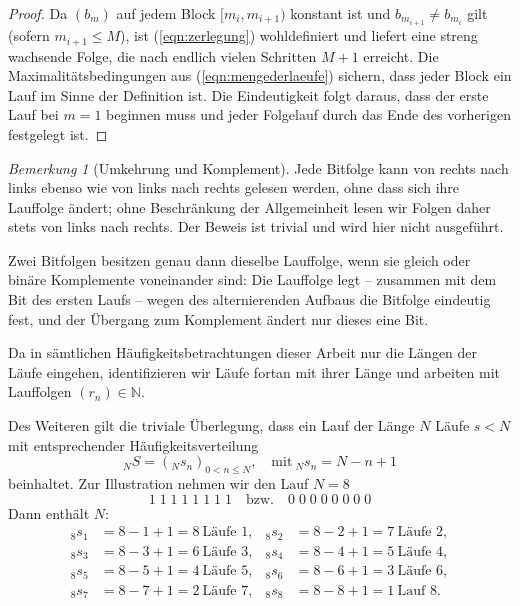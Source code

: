 \documentclass[11pt,a4paper]{scrartcl}
\theoremstyle{plain}
\theoremstyle{definition}
\theoremstyle{remark}
\newtheorem{bem}[satz]{Bemerkung}
\begin{document}
\begin{proof}
Da $(b_m)$ auf jedem Block $[m_i,m_{i+1})$ konstant ist und
$b_{m_{i+1}}\neq b_{m_i}$ gilt (sofern $m_{i+1}\leq M$), ist
(\ref{eqn:zerlegung}) wohldefiniert und liefert eine streng wachsende
Folge, die nach endlich vielen Schritten $M+1$ erreicht. Die
Maximalitätsbedingungen aus (\ref{eqn:mengederlaeufe}) sichern, dass
jeder Block ein Lauf im Sinne der Definition ist. Die Eindeutigkeit
folgt daraus, dass der erste Lauf bei $m=1$ beginnen muss und jeder
Folgelauf durch das Ende des vorherigen festgelegt ist.
\end{proof}

\begin{bem}[Umkehrung und Komplement]\label{bem:komplement}
Jede Bitfolge kann von rechts nach links ebenso wie von links nach
rechts gelesen werden, ohne dass sich ihre Lauffolge ändert; ohne
Beschränkung der Allgemeinheit lesen wir Folgen daher stets von links
nach rechts. Der Beweis ist trivial und wird hier nicht ausgeführt.

Zwei Bitfolgen besitzen genau dann dieselbe Lauffolge, wenn sie gleich
oder binäre Komplemente voneinander sind: Die Lauffolge legt -- zusammen
mit dem Bit des ersten Laufs -- wegen des alternierenden Aufbaus die
Bitfolge eindeutig fest, und der Übergang zum Komplement ändert nur
dieses eine Bit.
\end{bem}

\noindent Da in sämtlichen Häufigkeitsbetrachtungen dieser Arbeit nur die
Längen der Läufe eingehen, identifizieren wir Läufe fortan mit ihrer
Länge und arbeiten mit Lauffolgen $(r_n)\in\mathbb N$.

Des Weiteren gilt die triviale Überlegung, dass ein Lauf der Länge
$N$ Läufe $s<N$ mit entsprechender Häufigkeitsverteilung
\begin{equation}\label{eqn:haufigkeitenteillaeufe}
  _NS=(_Ns_n)_{0<n\leq N},\quad\text{mit}\ _Ns_n=N-n+1
\end{equation}
beinhaltet. Zur Illustration nehmen wir den Lauf $N=8$
\begin{equation}\label{eqn:teillaufindemlauf}
  1\;1\;1\;1\;1\;1\;1\;1\quad\text{bzw.}\quad 0\;0\;0\;0\;0\;0\;0\;0
\end{equation}
Dann enthält $N$:
\begin{align*}
  {}_8s_1&=8-1+1=8\ \text{Läufe } 1, & {}_8s_2&=8-2+1=7\ \text{Läufe } 2,\\
  {}_8s_3&=8-3+1=6\ \text{Läufe } 3, & {}_8s_4&=8-4+1=5\ \text{Läufe } 4,\\
  {}_8s_5&=8-5+1=4\ \text{Läufe } 5, & {}_8s_6&=8-6+1=3\ \text{Läufe } 6,\\
  {}_8s_7&=8-7+1=2\ \text{Läufe } 7, & {}_8s_8&=8-8+1=1\ \text{Lauf } 8.
\end{align*}
\end{document}
